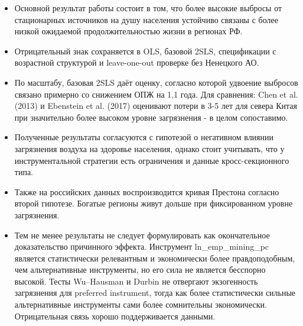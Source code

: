 \documentclass[11pt,a4paper]{article}
\begin{document}
\begin{itemize}
\item Основной результат работы состоит в том, что более высокие выбросы от стационарных источников на душу населения устойчиво связаны с более низкой ожидаемой продолжительностью жизни в регионах РФ.
\item Отрицательный знак сохраняется в OLS, базовой 2SLS, спецификации с возрастной структурой и leave-one-out проверке без Ненецкого АО.
\item По масштабу, базовая 2SLS даёт оценку, согласно которой удвоение выбросов связано примерно со снижением ОПЖ на 1,1 года. Для сравнения: Chen et al. (2013) и Ebenstein et al. (2017) оценивают потери в 3-5 лет для севера Китая при значительно более высоком уровне загрязнения - в целом сопоставимо.
\item Полученные результаты согласуются с гипотезой о негативном влиянии загрязнения воздуха на здоровье населения, однако стоит учитывать, что у инструментальной стратегии есть ограничения и данные кросс-секционного типа.
\item Также на российских данных воспроизводится кривая Престона согласно второй гипотезе. Богатые регионы живут дольше при фиксированном уровне загрязнения.
\item Тем не менее результаты не следует формулировать как окончательное доказательство причинного эффекта. Инструмент ln\_emp\_mining\_pc является статистически релевантным и экономически более правдоподобным, чем альтернативные инструменты, но его сила не является бесспорно высокой. Тесты Wu–Hausman и Durbin не отвергают экзогенность загрязнения для preferred instrument, тогда как более статистически сильные альтернативные инструменты сами более сомнительны экономически. Отрицательная связь хорошо поддерживается данными.
\end{itemize}
\end{document}
